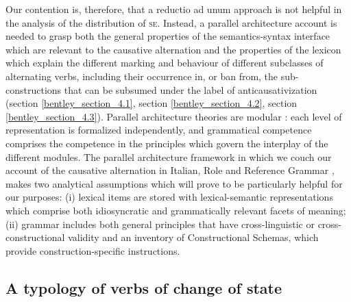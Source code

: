 \documentclass[output=paper,colorlinks,citecolor=brown
]{langscibook}
\begin{document}
Our contention is, therefore, that a reductio ad unum approach is not helpful in the analysis of the distribution of \textsc{se}. Instead, a parallel architecture account is needed to grasp both the general properties of the semantics-syntax interface which are relevant to the causative alternation and the properties of the lexicon which explain the different marking and behaviour of different subclasses of alternating verbs, including their occurrence in, or ban from, the sub-constructions that can be subsumed under the label of anticausativization (section \ref{bentley_section_4.1}, section \ref{bentley_section_4.2}, section \ref{bentley_section_4.3}). Parallel architecture theories are modular \citep{jackendoff2002foundations}: each level of representation is formalized independently, and grammatical competence comprises the competence in the principles which govern the interplay of the different modules. The parallel architecture framework in which we couch our account of the causative alternation in Italian, Role and Reference Grammar \citep[and references therein]{vanvalin2023principles}, makes two analytical assumptions which will prove to be particularly helpful for our purposes: (i) lexical items are stored with lexical-semantic representations which comprise both idiosyncratic and grammatically relevant facets of meaning; (ii) grammar includes both general principles that have cross-linguistic or cross-constructional validity and an inventory of Constructional Schemas, which provide construction-specific instructions. 

\subsection{A typology of verbs of change of state}
\label{bentley_section_5.2}
\end{document}
